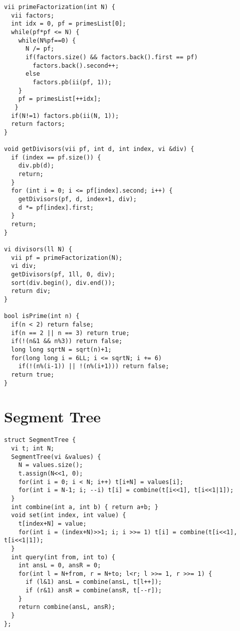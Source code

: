 \documentclass[8pt, oneside]{extarticle}
\begin{document}
\begin{multicols}{3}
\begin{lstlisting}
vii primeFactorization(int N) {
  vii factors;
  int idx = 0, pf = primesList[0];
  while(pf*pf <= N) {
    while(N%pf==0) {
      N /= pf;
      if(factors.size() && factors.back().first == pf)
        factors.back().second++;
      else
        factors.pb(ii(pf, 1));
    }
    pf = primesList[++idx];
   }
  if(N!=1) factors.pb(ii(N, 1));
  return factors;
}

void getDivisors(vii pf, int d, int index, vi &div) {
  if (index == pf.size()) {
    div.pb(d);
    return;
  }
  for (int i = 0; i <= pf[index].second; i++) {
    getDivisors(pf, d, index+1, div);
    d *= pf[index].first;
  }
  return;
}

vi divisors(ll N) {
  vii pf = primeFactorization(N);
  vi div;
  getDivisors(pf, 1ll, 0, div);
  sort(div.begin(), div.end());
  return div;
}

bool isPrime(int n) {
  if(n < 2) return false;
  if(n == 2 || n == 3) return true;
  if(!(n&1 && n%3)) return false;
  long long sqrtN = sqrt(n)+1;
  for(long long i = 6LL; i <= sqrtN; i += 6)
    if(!(n%(i-1)) || !(n%(i+1))) return false;
  return true;
}
\end{lstlisting}

\section{Segment Tree}

\begin{lstlisting}
struct SegmentTree {
  vi t; int N;
  SegmentTree(vi &values) {
    N = values.size();
    t.assign(N<<1, 0);
    for(int i = 0; i < N; i++) t[i+N] = values[i];
    for(int i = N-1; i; --i) t[i] = combine(t[i<<1], t[i<<1|1]);
  }
  int combine(int a, int b) { return a+b; }
  void set(int index, int value) {
    t[index+N] = value;
    for(int i = (index+N)>>1; i; i >>= 1) t[i] = combine(t[i<<1], t[i<<1|1]);
  }
  int query(int from, int to) {
    int ansL = 0, ansR = 0;
    for(int l = N+from, r = N+to; l<r; l >>= 1, r >>= 1) {
      if (l&1) ansL = combine(ansL, t[l++]);
      if (r&1) ansR = combine(ansR, t[--r]);
    }
    return combine(ansL, ansR);
  }
};


\end{lstlisting}
\end{multicols}
\end{document}
